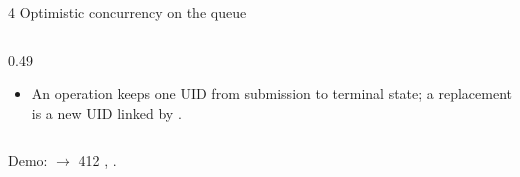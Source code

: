 \begin{frame}{4 \quad Optimistic concurrency on the queue}
\begin{columns}[T]
\begin{column}{0.49\textwidth}
\begin{block}{\vtwo{}}
\begin{itemize}
                    \item An operation keeps one UID from submission to terminal state; a replacement is a
                          new UID linked by .
                \end{itemize}
            \end{block}
        \end{column}
    \end{columns}
    \vspace{0.1cm}
    {\footnotesize\color{qsgray} Demo:  $\rightarrow$ 412
    , .\par}
\end{frame}

